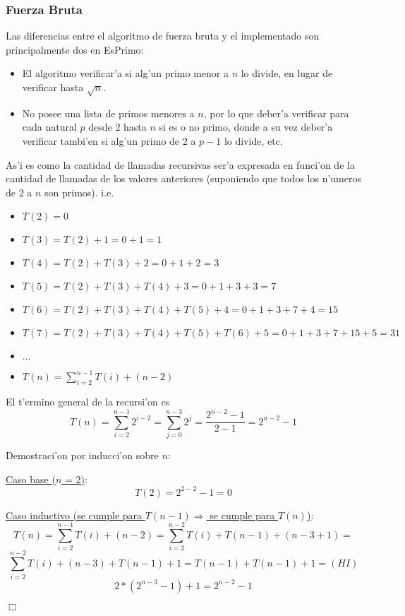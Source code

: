 \subsubsection{Fuerza Bruta}
Las diferencias entre el algoritmo de fuerza bruta y el implementado son principalmente dos en EsPrimo:
\begin{itemize}
\item El algoritmo verificar'a si alg'un primo menor a $n$ lo divide, en lugar de verificar hasta $\sqrt{n}$.
\item No posee una lista de primos menores a $n$, por lo que deber'a verificar para cada natural $p$ desde 2 hasta $n$ si es o no primo, donde a su vez deber'a verificar tambi'en si alg'un primo de 2 a $p-1$ lo divide, etc.
\end{itemize}
As'i es como la cantidad de llamadas recursivas ser'a expresada en funci'on de la cantidad de llamadas de los valores anteriores (suponiendo que todos los n'umeros de 2 a $n$ son primos). i.e.
\begin{itemize}
\item $T(2) = 0$
\item $T(3) = T(2) + 1 = 0 + 1 = 1$
\item $T(4) = T(2) + T(3) + 2 = 0 + 1 + 2 = 3$
\item $T(5) = T(2) + T(3) + T(4) + 3 = 0 + 1 + 3 + 3 = 7$
\item $T(6) = T(2) + T(3) + T(4) + T(5) + 4 = 0 + 1 + 3 + 7 + 4 = 15$
\item $T(7) = T(2) + T(3) + T(4) + T(5) + T(6) + 5 = 0 + 1 + 3 + 7 + 15 + 5 = 31$
\item $\dots$
\item $T(n) = \sum_{i=2}^{n-1}{T(i)} + (n-2)$
\end{itemize}

El t'ermino general de la recursi'on es
$$T(n) = \sum_{i=2}^{n-1}{2^{i-2}} = \sum_{j=0}^{n-3}{2^j} = \frac{2^{n-2}-1}{2-1} = 2^{n-2} - 1$$

Demostraci'on por inducci'on sobre $n$:

\underline{Caso base ($n$ = 2)}:
$$T(2) = 2^{2-2} - 1 = 0$$

\underline{Caso inductivo (se cumple para $T(n-1) \Longrightarrow$ se cumple para $T(n)$)}:
$$T(n) = \sum_{i=2}^{n-1}{T(i)} + (n-2) = \sum_{i=2}^{n-2}{T(i)} + T(n-1) + (n-3+1) =$$
$$\sum_{i=2}^{n-2}{T(i)} + (n-3) + T(n-1) + 1 = T(n-1) + T(n-1) + 1 =  (HI)$$
$$2*(2^{n-3} - 1) + 1 = 2^{n-2} - 1 $$
\begin{flushright}
$\Box$   
\end{flushright}

